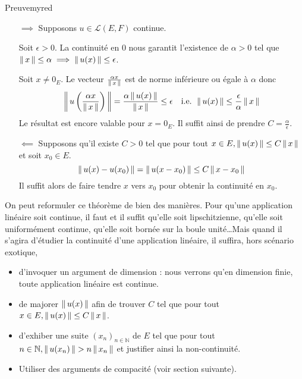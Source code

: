     \begin{demo}{Preuve}{myred}
        \begin{itemize}
            \item[$\implies$] Supposons $u \in \mathcal{L}(E,F)$ continue.
            
            Soit $\epsilon > 0$. La continuité en $0$ nous garantit l’existence de $\alpha > 0$ tel que $\left\lVert \,x \, \right\rVert \leq \alpha \implies \left\lVert \,u(x) \, \right\rVert \leq \epsilon$.

            Soit $x \neq 0_E$. Le vecteur $\frac{\alpha x}{\left\lVert \,x \, \right\rVert}$ est de norme inférieure ou égale à $\alpha$ donc 
            \[ \left\lVert \,u\left(\frac{\alpha x}{\left\lVert \,x \, \right\rVert}\right) \, \right\rVert= \frac{\alpha \left\lVert \,u(x) \, \right\rVert}{\left\lVert \,x \, \right\rVert} \leq \epsilon \quad \text{i.e. } \left\lVert \,u(x) \, \right\rVert \leq \frac{\epsilon}{\alpha} \left\lVert \,x \, \right\rVert \] 
            Le résultat est encore valable pour $x = 0_E$. Il suffit ainsi de prendre $C = \frac{\alpha}{\epsilon}$.
            \item[$\impliedby$] Supposons qu’il existe $C>0$ tel que pour tout $x \in E, \left\lVert \,u(x) \, \right\rVert \leq C \left\lVert \,x \, \right\rVert$ et soit $x_0 \in E$. 
            \[ \left\lVert \,u(x) - u(x_0) \, \right\rVert =\left\lVert \,u(x-x_0) \, \right\rVert \leq C \left\lVert \,x-x_0 \, \right\rVert \]
            Il suffit alors de faire tendre $x$ vers $x_0$ pour obtenir la continuité en $x_0$.
        \end{itemize}
    \end{demo}

    On peut reformuler ce théorème de bien des manières. Pour qu’une application linéaire soit continue, il faut et il suffit qu’elle soit lipschitzienne, qu’elle soit uniformément continue, qu’elle soit bornée sur la boule unité\ldots Mais quand il s’agira d’étudier la continuité d’une application linéaire, il suffira, hors scénario exotique,
    \begin{itemize}
        \item d’invoquer un argument de dimension : nous verrons qu’en dimension finie, toute application linéaire est continue.
        \item de majorer $\left\lVert \,u(x) \, \right\rVert$ afin de trouver $C$ tel que pour tout $x \in E, \left\lVert \,u(x) \, \right\rVert \leq C \left\lVert \,x \, \right\rVert$.
        \item d’exhiber une suite $(x_n)_{n \in \mathbb{N}}$ de $E$ tel que pour tout $n \in \mathbb{N}, \left\lVert \,u(x_n) \, \right\rVert > n \left\lVert \,x_n \, \right\rVert$ et justifier ainsi la non-continuité.
        \item Utiliser des arguments de compacité (voir section suivante).
    \end{itemize}

